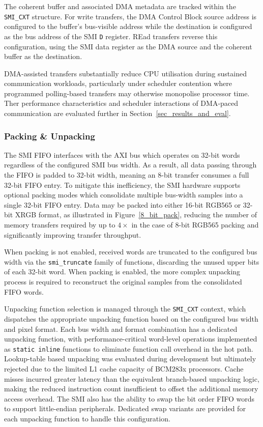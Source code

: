 \documentclass[final]{cmpreport}
\begin{document}
The coherent buffer and associated DMA metadata are tracked within the \texttt{SMI\_CXT} structure. For write transfers, the DMA Control Block source address is configured to the buffer's bus-visible address while the destination is configured as the bus address of the SMI \texttt{D} register. REad transfers reverse this configuration, using the SMI data register as the DMA source and the coherent buffer as the destination.

DMA-assisted transfers substantially reduce CPU utilisation during sustained communication workloads, particularly under scheduler contention where programmed polling-based transfers may otherwise monopolise processor time. Ther performance characteristics and scheduler interactions of DMA-paced communication are evaluated further in Section~\ref{sec_results_and_eval}.

\subsubsection{Packing \& Unpacking}
The SMI FIFO interfaces with the AXI bus which operates on 32-bit words regardless of the configured SMI bus width. As a result, all data passing through the FIFO is padded to 32-bit width, meaning an 8-bit transfer consumes a full 32-bit FIFO entry. To mitigate this inefficiency, the SMI hardware supports optional packing modes which consolidate multiple bus-width samples into a single 32-bit FIFO entry. Data may be packed into either 16-bit RGB565 or 32-bit XRGB format, as illustrated in Figure~\ref{8_bit_pack}, reducing the number of memory transfers required by up to $4\times$ in the case of 8-bit RGB565 packing and significantly improving transfer throughput.

When packing is not enabled, received words are truncated to the configured bus width via the \texttt{smi\_truncate} family of functions, discarding the unused upper bits of each 32-bit word. When packing is enabled, the more complex unpacking process is required to reconstruct the original samples from the consolidated FIFO words.

Unpacking function selection is managed through the \texttt{SMI\_CXT} context, which dispatches the appropriate unpacking function based on the configured bus width and pixel format. Each bus width and format combination has a dedicated unpacking function, with performance-critical word-level operations implemented as \texttt{static inline} functions to eliminate function call overhead in the hot path. Lookup-table based unpacking was evaluated during development but ultimately rejected due to the limited L1 cache capacity of BCM283x processors. Cache misses incurred greater latency than the equivalent branch-based unpacking logic, making the reduced instruction count insufficient to offset the additional memory access overhead. The SMI also has the ability to swap the bit order FIFO words to support little-endian peripherals. Dedicated swap variants are provided for each unpacking function to handle this configuration.
\end{document}
